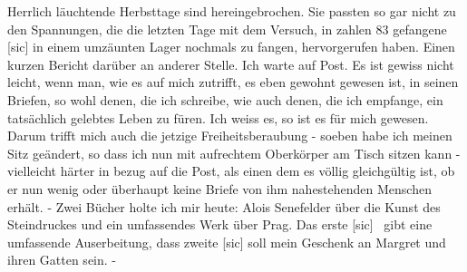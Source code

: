 \def\day{13. Oktober 1942 *}
\mktitle

Herrlich l\"{a}uchtende Herbsttage sind hereingebrochen.
Sie passten so gar nicht zu den Spannungen, die die letzten Tage mit dem Versuch, in zahlen 83 gefangene{\color{red} [sic] } in einem umz\"{a}unten Lager nochmals zu fangen, hervorgerufen haben.
Einen kurzen Bericht dar\"{u}ber an anderer Stelle.
Ich warte auf Post.
Es ist gewiss nicht leicht, wenn man, wie es auf mich zutrifft, es eben gewohnt gewesen ist, in seinen Briefen, so wohl denen, die ich schreibe, wie auch denen, die ich empfange, ein tats\"{a}chlich gelebtes Leben zu f\"{u}ren.
Ich weiss es, so ist es f\"{u}r mich gewesen.
Darum trifft mich auch die jetzige Freiheitsberaubung - soeben habe ich meinen Sitz ge\"{a}ndert, so dass ich nun mit aufrechtem Oberk\"{o}rper am Tisch sitzen kann - vielleicht h\"{a}rter in bezug auf die Post, als einen dem es v\"{o}llig gleichg\"{u}ltig ist, ob er nun wenig oder \"{u}berhaupt keine Briefe von ihm nahestehenden Menschen erh\"{a}lt.
- Zwei B\"{u}cher holte ich mir heute: Alois Senefelder \"{u}ber die Kunst des Steindruckes und ein umfassendes Werk \"{u}ber Prag.
Das erste{\color{red} [sic] } gibt eine umfassende Auserbeitung, dass zweite{\color{red} [sic] } soll mein Geschenk an Margret und ihren Gatten sein. -

\clearpage

